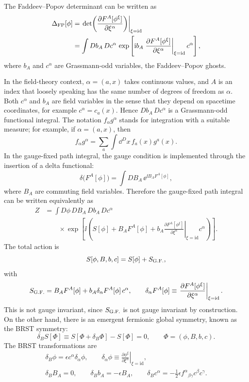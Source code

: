 The Faddeev--Popov determinant can be written as
\[
\begin{aligned}
  \Delta_{\rm FP}[\phi]
  &=
  \left.
  \det\!\left(
    \frac{\partial F^A[\phi^\xi]}{\partial \xi^\alpha}
  \right)\right|_{\xi=\mathrm{id}}
\\
  &=
  \int Db_A\,Dc^\alpha\,
  \exp\left[
    \mathrm{i} b_A
    \left.
    \frac{\partial F^A[\phi^\xi]}{\partial \xi^\alpha}
    \right|_{\xi=\mathrm{id}}
    c^\alpha
  \right],
\end{aligned}
\]
where \(b_A\) and \(c^\alpha\) are Grassmann-odd variables, the
Faddeev--Popov ghosts.

In the field-theory context, \(\alpha=(a,x)\) takes continuous values,
and \(A\) is an index that loosely speaking has the same number of
degrees of freedom as \(\alpha\).  Both \(c^\alpha\) and \(b_A\) are
field variables in the sense that they depend on spacetime coordinates,
for example \(c^\alpha=c_a(x)\).  Hence \(Db_A\,Dc^\alpha\) is a
Grassmann-odd functional integral.  The notation \(f_\alpha g^\alpha\)
stands for integration with a suitable measure; for example, if
\(\alpha=(a,x)\), then
\[
  f_\alpha g^\alpha
  =
  \sum_a\int\dd^D x\, f_a(x)g^a(x).
\]
In the gauge-fixed path integral, the gauge condition is implemented
through the insertion of a delta functional:
\[
  \delta\!\bigl(F^A[\phi]\bigr)
  =
  \int DB_A\,\ee^{\ii B_A F^A[\phi]},
\]
where \(B_A\) are commuting field variables.  Therefore the gauge-fixed
path integral can be written equivalently as
\[
\begin{aligned}
  Z
  &=
  \int D\phi\,DB_A\,Db_A\,Dc^\alpha
  \\
  &\qquad\times
  \exp\left[
    \ii\left(
      S[\phi]
      +B_A F^A[\phi]
      +b_A
      \left.
      \frac{\partial F^A[\phi^\xi]}{\partial\xi^\alpha}
      \right|_{\xi=\mathrm{id}}
      c^\alpha
    \right)
  \right].
\end{aligned}
\]
The total action is
\[
  S[\phi,B,b,c]=S[\phi]+S_{\rm G.F.},
\]
with
\[
  S_{\rm G.F.}
  =
  B_A F^A[\phi]
  +b_A\delta_\alpha F^A[\phi]\,c^\alpha,
  \qquad
  \delta_\alpha F^A[\phi]
  \equiv
  \left.
  \frac{\partial F^A[\phi^\xi]}{\partial\xi^\alpha}
  \right|_{\xi=\mathrm{id}}.
\]
This is not gauge invariant, since \(S_{\rm G.F.}\) is not gauge
invariant by construction.  On the other hand, there is an emergent
fermionic global symmetry, known as the BRST symmetry:
\[
  \delta_B S[\Phi]
  \equiv
  S[\Phi+\delta_B\Phi]-S[\Phi]
  =
  0,
  \qquad
  \Phi=(\phi,B,b,c).
\]
The BRST transformations are
\[
\begin{gathered}
  \delta_B\phi
  =
  \epsilon c^\alpha\delta_\alpha\phi,
  \qquad
  \delta_\alpha\phi
  \equiv
  \left.
  \frac{\partial\phi^\xi}{\partial\xi^\alpha}
  \right|_{\xi=\mathrm{id}},
\\
  \delta_B B_A=0,
  \qquad
  \delta_B b_A=-\epsilon B_A,
  \qquad
  \delta_B c^\alpha
  =
  -\frac12\epsilon f^\alpha{}_{\beta\gamma}c^\beta c^\gamma.
\end{gathered}
\]
